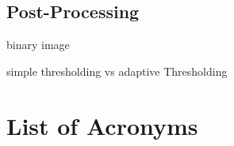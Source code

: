 \documentclass[bibliography=totoc]{scrartcl}
\begin{document}
		\subsection{Post-Processing}
		binary image

		simple thresholding vs adaptive Thresholding
			
\section*{List of Acronyms} 

\begin{acronym}[....]
\end{acronym}
			

\end{document}
